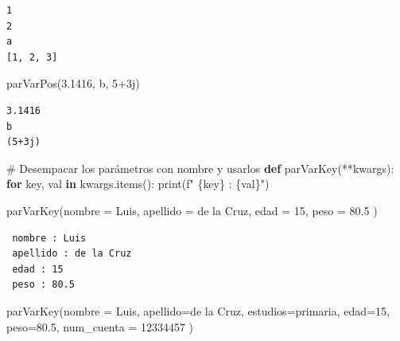 \documentclass[
  spanish,
  letterpaper,
]{scrbook}
\newenvironment{Shaded}{\begin{snugshade}}{\end{snugshade}}
\newcommand{\BuiltInTok}[1]{\textcolor[rgb]{0.00,0.23,0.31}{#1}}
\newcommand{\CommentTok}[1]{\textcolor[rgb]{0.37,0.37,0.37}{#1}}
\newcommand{\ControlFlowTok}[1]{\textcolor[rgb]{0.00,0.23,0.31}{\textbf{#1}}}
\newcommand{\DecValTok}[1]{\textcolor[rgb]{0.68,0.00,0.00}{#1}}
\newcommand{\FloatTok}[1]{\textcolor[rgb]{0.68,0.00,0.00}{#1}}
\newcommand{\KeywordTok}[1]{\textcolor[rgb]{0.00,0.23,0.31}{\textbf{#1}}}
\newcommand{\NormalTok}[1]{\textcolor[rgb]{0.00,0.23,0.31}{#1}}
\newcommand{\OperatorTok}[1]{\textcolor[rgb]{0.37,0.37,0.37}{#1}}
\newcommand{\OtherTok}[1]{\textcolor[rgb]{0.00,0.23,0.31}{#1}}
\newcommand{\SpecialCharTok}[1]{\textcolor[rgb]{0.37,0.37,0.37}{#1}}
\newcommand{\SpecialStringTok}[1]{\textcolor[rgb]{0.13,0.47,0.30}{#1}}
\newcommand{\StringTok}[1]{\textcolor[rgb]{0.13,0.47,0.30}{#1}}
\theoremstyle{definition}
\theoremstyle{remark}
\begin{document}
\begin{verbatim}
1
2
a
[1, 2, 3]
\end{verbatim}

\begin{Shaded}
\begin{Highlighting}[]
\NormalTok{parVarPos(}\FloatTok{3.1416}\NormalTok{, }\StringTok{\textquotesingle{}b\textquotesingle{}}\NormalTok{, }\DecValTok{5}\OperatorTok{+}\OtherTok{3j}\NormalTok{)}
\end{Highlighting}
\end{Shaded}

\begin{verbatim}
3.1416
b
(5+3j)
\end{verbatim}

\begin{Shaded}
\begin{Highlighting}[]
\CommentTok{\# Desempacar los parámetros con nombre y usarlos}
\KeywordTok{def}\NormalTok{ parVarKey(}\OperatorTok{**}\NormalTok{kwargs):}
    \ControlFlowTok{for}\NormalTok{ key, val }\KeywordTok{in}\NormalTok{ kwargs.items():}
        \BuiltInTok{print}\NormalTok{(}\SpecialStringTok{f" }\SpecialCharTok{\{}\NormalTok{key}\SpecialCharTok{\}}\SpecialStringTok{ : }\SpecialCharTok{\{}\NormalTok{val}\SpecialCharTok{\}}\SpecialStringTok{"}\NormalTok{)}
\end{Highlighting}
\end{Shaded}

\begin{Shaded}
\begin{Highlighting}[]
\NormalTok{parVarKey(nombre }\OperatorTok{=} \StringTok{\textquotesingle{}Luis\textquotesingle{}}\NormalTok{, }
\NormalTok{          apellido }\OperatorTok{=} \StringTok{\textquotesingle{}de la Cruz\textquotesingle{}}\NormalTok{, }
\NormalTok{          edad }\OperatorTok{=} \DecValTok{15}\NormalTok{, }
\NormalTok{          peso }\OperatorTok{=} \FloatTok{80.5}\NormalTok{ )}
\end{Highlighting}
\end{Shaded}

\begin{verbatim}
 nombre : Luis
 apellido : de la Cruz
 edad : 15
 peso : 80.5
\end{verbatim}

\begin{Shaded}
\begin{Highlighting}[]
\NormalTok{parVarKey(nombre }\OperatorTok{=} \StringTok{\textquotesingle{}Luis\textquotesingle{}}\NormalTok{, }
\NormalTok{          apellido}\OperatorTok{=}\StringTok{\textquotesingle{}de la Cruz\textquotesingle{}}\NormalTok{, }
\NormalTok{          estudios}\OperatorTok{=}\StringTok{\textquotesingle{}primaria\textquotesingle{}}\NormalTok{, }
\NormalTok{          edad}\OperatorTok{=}\DecValTok{15}\NormalTok{, }
\NormalTok{          peso}\OperatorTok{=}\FloatTok{80.5}\NormalTok{, }
\NormalTok{          num\_cuenta }\OperatorTok{=} \DecValTok{12334457}\NormalTok{ )}
\end{Highlighting}
\end{Shaded}
\end{document}
